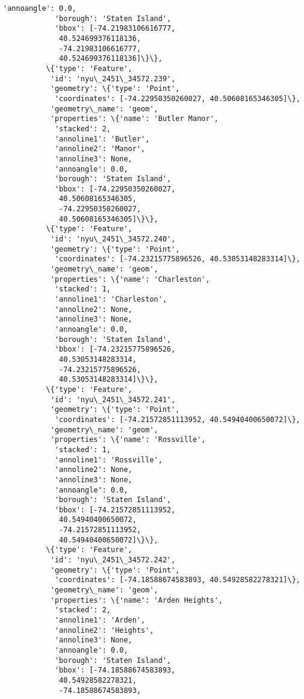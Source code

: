 \documentclass[11pt]{article}
\begin{document}
\begin{Verbatim}[commandchars=\\\{\}]
            'annoangle': 0.0,
            'borough': 'Staten Island',
            'bbox': [-74.21983106616777,
             40.524699376118136,
             -74.21983106616777,
             40.524699376118136]\}\},
          \{'type': 'Feature',
           'id': 'nyu\_2451\_34572.239',
           'geometry': \{'type': 'Point',
            'coordinates': [-74.22950350260027, 40.50608165346305]\},
           'geometry\_name': 'geom',
           'properties': \{'name': 'Butler Manor',
            'stacked': 2,
            'annoline1': 'Butler',
            'annoline2': 'Manor',
            'annoline3': None,
            'annoangle': 0.0,
            'borough': 'Staten Island',
            'bbox': [-74.22950350260027,
             40.50608165346305,
             -74.22950350260027,
             40.50608165346305]\}\},
          \{'type': 'Feature',
           'id': 'nyu\_2451\_34572.240',
           'geometry': \{'type': 'Point',
            'coordinates': [-74.23215775896526, 40.53053148283314]\},
           'geometry\_name': 'geom',
           'properties': \{'name': 'Charleston',
            'stacked': 1,
            'annoline1': 'Charleston',
            'annoline2': None,
            'annoline3': None,
            'annoangle': 0.0,
            'borough': 'Staten Island',
            'bbox': [-74.23215775896526,
             40.53053148283314,
             -74.23215775896526,
             40.53053148283314]\}\},
          \{'type': 'Feature',
           'id': 'nyu\_2451\_34572.241',
           'geometry': \{'type': 'Point',
            'coordinates': [-74.21572851113952, 40.54940400650072]\},
           'geometry\_name': 'geom',
           'properties': \{'name': 'Rossville',
            'stacked': 1,
            'annoline1': 'Rossville',
            'annoline2': None,
            'annoline3': None,
            'annoangle': 0.0,
            'borough': 'Staten Island',
            'bbox': [-74.21572851113952,
             40.54940400650072,
             -74.21572851113952,
             40.54940400650072]\}\},
          \{'type': 'Feature',
           'id': 'nyu\_2451\_34572.242',
           'geometry': \{'type': 'Point',
            'coordinates': [-74.18588674583893, 40.54928582278321]\},
           'geometry\_name': 'geom',
           'properties': \{'name': 'Arden Heights',
            'stacked': 2,
            'annoline1': 'Arden',
            'annoline2': 'Heights',
            'annoline3': None,
            'annoangle': 0.0,
            'borough': 'Staten Island',
            'bbox': [-74.18588674583893,
             40.54928582278321,
             -74.18588674583893,

\end{Verbatim}
\end{document}
